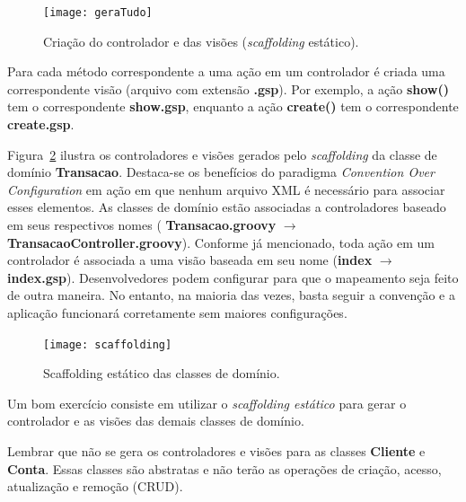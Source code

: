 \vspace{0.5cm}

\begin{figure}[htbp]
\centering\texttt{[image: geraTudo]}
\caption{Criação do controlador e das visões ({\it scaffolding} estático).}
\label{geraTudoFig}
\end{figure}

\vspace{0.5cm}

 Para  cada método  correspondente a  uma ação  em um
controlador  é  criada  uma  correspondente  visão (arquivo  com  extensão  {\bf
  .gsp}). Por exemplo, a ação  {\bf show()} tem o correspondente {\bf show.gsp},
enquanto a ação {\bf create()} tem o correspondente {\bf create.gsp}. 

\newpage

Figura~\ref{scaffoldingFig} ilustra os controladores  e visões gerados pelo {\it
  scaffolding} da  classe de domínio {\bf Transacao}.   Destaca-se os benefícios
do paradigma {\it  Convention Over Configuration} em ação  em que nenhum arquivo
XML  é necessário para  associar esses  elementos. As  classes de  domínio estão
associadas   a   controladores  baseado   em   seus   respectivos  nomes   ({\bf
  Transacao.groovy}  $\rightarrow$ {\bf  TransacaoController.groovy}).  Conforme
já mencionado,  toda ação em um controlador  é associada a uma  visão baseada em
seu  nome ({\bf  index} $\rightarrow$  {\bf index.gsp}).   Desenvolvedores podem
configurar para  que o mapeamento seja  feito de outra maneira.   No entanto, na
maioria  das  vezes,   basta  seguir  a  convenção  e   a  aplicação  funcionará
corretamente      sem     maiores      configurações.      

\vspace{0.5cm}

\begin{figure}[htbp]
\centering\texttt{[image: scaffolding]}
\caption{Scaffolding estático das classes de domínio.}
\label{scaffoldingFig}
\end{figure}

\begin{remark}
Um bom exercício consiste em utilizar  o {\it scaffolding estático} para gerar o
controlador e as visões das demais classes de domínio.
\end{remark}

\begin{cBox}
Lembrar que não se gera os  controladores e visões para as classes {\bf Cliente}
e {\bf Conta}.  Essas classes são abstratas e não terão as operações de criação,
acesso, atualização e remoção (CRUD). 
\end{cBox}

